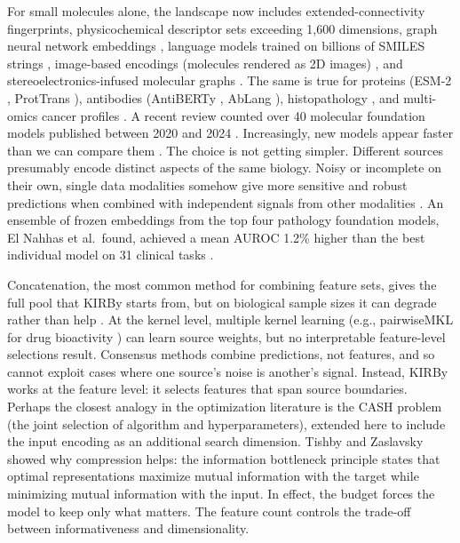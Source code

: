 For small molecules alone, the landscape now includes extended-connectivity fingerprints, physicochemical descriptor sets exceeding 1,600 dimensions, graph neural network embeddings \citep{Yang2019, Fang2022}, language models trained on billions of SMILES strings \citep{ross2022}, image-based encodings (molecules rendered as 2D images) \citep{Zeng2022}, and stereoelectronics-infused molecular graphs \citep{Boiko2025}. The same is true for proteins (ESM-2 \citep{Lin2023}, ProtTrans \citep{Elnaggar2022}), antibodies (AntiBERTy \citep{Ruffolo2021}, AbLang \citep{Olsen2022}), histopathology \citep{ElNahhas2025}, and multi-omics cancer profiles \citep{Steyaert2023}. A recent review counted over 40 molecular foundation models published between 2020 and 2024 \citep{Song2026}. Increasingly, new models appear faster than we can compare them \citep{Bommasani2021}. The choice is not getting simpler. Different sources presumably encode distinct aspects of the same biology. Noisy or incomplete on their own, single data modalities somehow give more sensitive and robust predictions when combined with independent signals from other modalities \citep{Steyaert2023}. An ensemble of frozen embeddings from the top four pathology foundation models, El Nahhas et al.\ found, achieved a mean AUROC 1.2\% higher than the best individual model on 31 clinical tasks \citep{ElNahhas2025}.

Concatenation, the most common method for combining feature sets, gives the full pool that KIRBy starts from, but on biological sample sizes it can degrade rather than help \citep{Bellman1961, Stahlschmidt2022}. At the kernel level, multiple kernel learning \citep{Gonen2011} (e.g., pairwiseMKL for drug bioactivity \citep{Cichonska2018}) can learn source weights, but no interpretable feature-level selections result. Consensus methods \citep{Valsecchi2020} combine predictions, not features, and so cannot exploit cases where one source's noise is another's signal. Instead, KIRBy works at the feature level: it selects features that span source boundaries. Perhaps the closest analogy in the optimization literature is the CASH problem \citep{Thornton2013} (the joint selection of algorithm and hyperparameters), extended here to include the input encoding as an additional search dimension. Tishby and Zaslavsky \citep{Tishby2015} showed why compression helps: the information bottleneck principle states that optimal representations maximize mutual information with the target while minimizing mutual information with the input. In effect, the budget forces the model to keep only what matters. The feature count controls the trade-off between informativeness and dimensionality.

